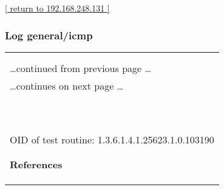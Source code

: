 \documentclass{article}
\begin{document}
\begin{footnotesize}\hyperref[host:192.168.248.131]{[ return to 192.168.248.131 ]}\end{footnotesize}
\subsubsection{Log general/icmp}
\label{port:192.168.248.131 general/icmp Log}

\begin{longtable}{|p{}|}
\hline
\rowcolor{openvas_log}{\color{white}{Log (CVSS: 0.0) }}\\
\rowcolor{openvas_log}{\color{white}{NVT: ICMP Timestamp Detection}}\\
\hline
\endfirsthead
\hfill\ldots continued from previous page \ldots \\
\hline
\endhead
\hline
\ldots continues on next page \ldots \\
\endfoot
\hline
\endlastfoot
\\
\rowcolor{white}{\verb= Summary:=}\\
\rowcolor{white}{\verb= The remote host responded to an ICMP timestamp request. The Timestamp Reply is=}\\
\rowcolor{white}{\verb=an ICMP message which replies to a Timestamp message. It consists of the=}\\
\rowcolor{white}{\verb=originating timestamp sent by the sender of the Timestamp as well as a receive=}\\
\rowcolor{white}{\verb=timestamp and a transmit timestamp. This information could theoretically be used=}\\
\rowcolor{white}{\verb=to exploit weak time-based random number generators in other services.=}\\
\rowcolor{white}{\verb==}\\
\rowcolor{white}{\verb==}\\
\\
OID of test routine: 1.3.6.1.4.1.25623.1.0.103190\\
\\

      \hline
      \\
\textbf{References}\\
\rowcolor{white}{\verb=CVE: CVE-1999-0524=}\\
\rowcolor{white}{\verb=Other:=}\\
\rowcolor{white}{\verb=  URL:http://www.ietf.org/rfc/rfc0792.txt=}\\
\end{longtable}
\end{document}
